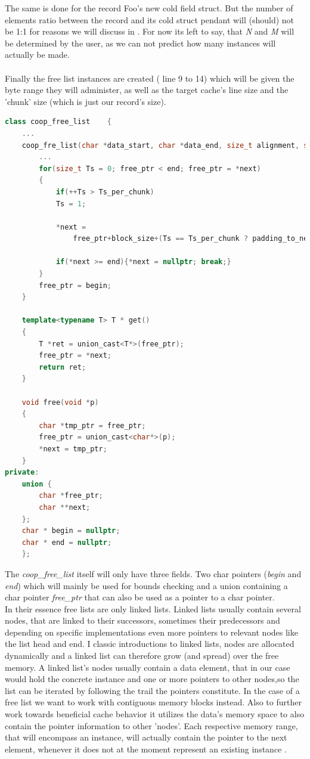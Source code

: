 The same is done for the record Foo's new cold field struct. But the number of elements ratio between the record and its cold struct pendant will (should) not be 1:1 for reasons we will discuss in . For now its left to say, that \textit{N} and \textit{M} will be determined by the user, as we can not predict how many instances will actually be made.\\\\
Finally the free list instances are created ( line 9 to 14) which will be given the byte range they will administer, as well as the target cache's line size and the 'chunk' size (which is just our record's size).
\begin{lstlisting}[language=C++,name={Shortened excerpt of COOP's free list without asserts and some initialization code.},morekeywords={constexpr, size_t},label={free_list}]
	class coop_free_list	{
	...
	coop_fre_list(char *data_start, char *data_end, size_t alignment, size_t block_size){
		...
		for(size_t Ts = 0; free_ptr < end; free_ptr = *next)
		{
			if(++Ts > Ts_per_chunk)
			Ts = 1;
			
			*next =
				free_ptr+block_size+(Ts == Ts_per_chunk ? padding_to_next : 0);
			
			if(*next >= end){*next = nullptr; break;}
		}
		free_ptr = begin;
	}
	
	template<typename T> T * get()
	{
		T *ret = union_cast<T*>(free_ptr);
		free_ptr = *next;
		return ret;
	}
	
	void free(void *p)
	{
		char *tmp_ptr = free_ptr;
		free_ptr = union_cast<char*>(p);
		*next = tmp_ptr;
	}
private:
	union {
		char *free_ptr;
		char **next;
	};
	char * begin = nullptr;
	char * end = nullptr;
	};
\end{lstlisting}
The \textit{coop\_free\_list} itself will only have three fields. Two char pointers (\textit{begin} and \textit{end}) which will mainly be used for bounds checking and a union containing a char pointer \textit{free\_ptr} that can also be used as a pointer to a char pointer.\\
In their essence free lists are only linked lists. Linked lists usually contain several nodes, that are linked to their successors, sometimes their predecessors and depending on specific implementations even more pointers to relevant nodes like the list head and end. I classic introductions to linked lists, nodes are allocated dynamically and a linked list can therefore grow (and spread) over the free memory. A linked list's nodes usually contain a data element, that in our case would hold the concrete instance and one or more pointers to other nodes,so the list can be iterated by following the trail the pointers constitute. In the case of a free list we want to work with contiguous memory blocks instead. Also to further work towards beneficial cache behavior it utilizes the data's memory space to also contain the pointer information to other 'nodes'. Each respective memory range, that will encompass an instance, will actually contain the pointer to the next element, whenever it does not at the moment represent an existing instance .\\
